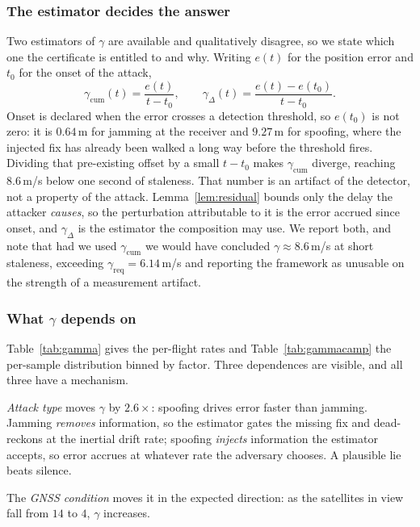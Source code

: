 \subsubsection{The estimator decides the answer}
Two estimators of $\gamma$ are available and qualitatively disagree, so we state which one the certificate is entitled to and why. Writing $e(t)$ for the
position error and $t_0$ for the onset of the attack,
\begin{equation}
\label{eq:gammaest}
\gamma_{\mathrm{cum}}(t)=\frac{e(t)}{t-t_0},
\qquad
\gamma_{\Delta}(t)=\frac{e(t)-e(t_0)}{t-t_0}.
\end{equation}
Onset is declared when the error crosses a detection threshold, so $e(t_0)$ is
not zero: it is $0.64$\,m for jamming at the receiver and $9.27$\,m for
spoofing, where the injected fix has already been walked a long way before the
threshold fires. Dividing that pre-existing offset by a small $t-t_0$ makes
$\gamma_{\mathrm{cum}}$ diverge, reaching $8.6$\,m/s below one second of
staleness. That number is an artifact of the detector, not a property of the
attack. Lemma~\ref{lem:residual} bounds only the delay the attacker
\emph{causes}, so the perturbation attributable to it is the error accrued since
onset, and $\gamma_{\Delta}$ is the estimator the composition may use. We report
both, and note that had we used $\gamma_{\mathrm{cum}}$ we would have concluded
$\gamma\approx8.6$\,m/s at short staleness, exceeding
$\gamma_{\mathrm{req}}=6.14$\,m/s and reporting the framework as unusable on the
strength of a measurement artifact.

\subsubsection{What $\gamma$ depends on}
Table~\ref{tab:gamma} gives the per-flight rates and
Table~\ref{tab:gammacamp} the per-sample distribution binned by factor. Three dependences are visible, and all three have a mechanism.

\emph{Attack type} moves $\gamma$ by $2.6\times$: spoofing drives error faster
than jamming. Jamming \emph{removes} information, so the estimator gates the
missing fix and dead-reckons at the inertial drift rate; spoofing \emph{injects}
information the estimator accepts, so error accrues at whatever rate the
adversary chooses. A plausible lie beats silence.

The \emph{GNSS condition} moves it in the expected direction: as the satellites in view
fall from $14$ to $4$, $\gamma$ increases.

